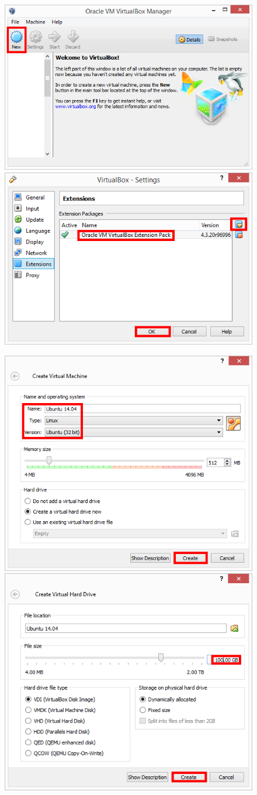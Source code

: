 \begin{figure}[h]
\centering
\includegraphics[width=0.49\columnwidth]{pictures/chapter3/vm7.png}
\includegraphics[width=0.49\columnwidth]{pictures/chapter3/vm8.png}
\end{figure}

\begin{figure}[h]
\centering
\includegraphics[width=0.49\columnwidth]{pictures/chapter3/vm9.png}
\includegraphics[width=0.49\columnwidth]{pictures/chapter3/vm10.png}
\end{figure}

